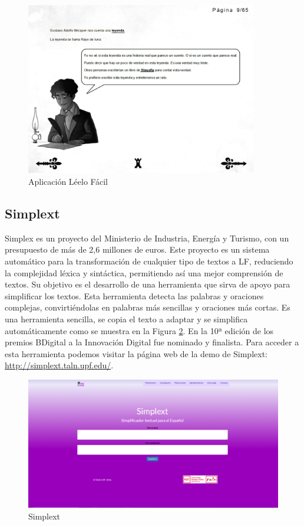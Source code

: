 \begin{figure}[h]
	\centering
	\includegraphics[width=0.9\textwidth]{Imagenes/ProyectosMateriales/leeloFacil}
	\caption{Aplicación Léelo Fácil}
	\label{fig:leeloFacil}
\end{figure} 

\subsection{Simplext }

Simplex \citep{PLN1000}  es un proyecto del Ministerio de Industria, Energía y Turismo, con un presupuesto de más de 2,6 millones de euros. Este proyecto es un sistema automático para la transformación de cualquier tipo de textos a LF, reduciendo la complejidad léxica y sintáctica, permitiendo así una mejor comprensión de textos. Su objetivo es el desarrollo de una herramienta que sirva de apoyo para simplificar los textos. Esta herramienta detecta las palabras y oraciones complejas, convirtiéndolas en palabras más sencillas y oraciones más cortas. Es una herramienta sencilla, se copia el texto a adaptar y se simplifica automáticamente como se muestra en la Figura \ref{fig:simplext}. En la 10ª edición de los premios BDigital a la Innovación Digital fue nominado y finalista.
Para acceder a esta herramienta podemos visitar la página web de la demo de Simplext: \url{http://simplext.taln.upf.edu/}.


\begin{figure}[h]
	\centering
	\includegraphics[width=1.0\textwidth]{Imagenes/ProyectosMateriales/simplext}
	\caption{Simplext}
	\label{fig:simplext}
\end{figure} 

